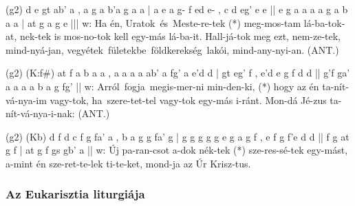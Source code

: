 \documentclass[twoside]{article}
\begin{document}

\begin{aretino}
(g2) d e gt ab' a , a g a b'a g a a | a e a g- f ed e- , c d eg' e e || e g a a a a g a b a a | at g a g e |||
w: Ha én, Uratok~és~Meste-re-tek (*) meg-mos-tam lá-ba-tok-at, nek-tek is mos-no-tok kell egy-más lá-ba-it. Hall-já-tok meg ezt, nem-ze-tek, mind-nyá-jan, vegyétek~fületekbe~földkerekség~lakói, mind-any-nyi-an. (ANT.)
\end{aretino}


\begin{aretino}
(g2) (K:f#) at f a b a a , a a a a ab' a fg' a e'd d | gt eg' f , e'd e g f d d || g'f ga' a a a a b a g fg' ||
w: Arról~fogja~megis-mer-ni min-den-ki, (*) hogy az én ta-nít-vá-nya-im vagy-tok, ha~szere-tet-tel vagy-tok egy-más i-ránt. Mon-dá Jé-zus ta-nít-vá-nya-i-nak: (ANT.)
\end{aretino}


\begin{aretino}
(g2) (Kb) d f d c f g fa' a , b a g g fa' g | g g g g g e g a g f , e f g f'e d d || f g at g f | at g f gs gb' a ||
w: Új pa-ran-csot a-dok nék-tek (*) sze-res-sé-tek egy-mást, a-mint én sze-ret-te-lek ti-te-ket, mond-ja az Úr Krisz-tus.
\end{aretino}

\begin{psalmsheet}[tone=1]
\end{psalmsheet}


\subsubsection*{Az Eukarisztia liturgiája}

\end{document}
